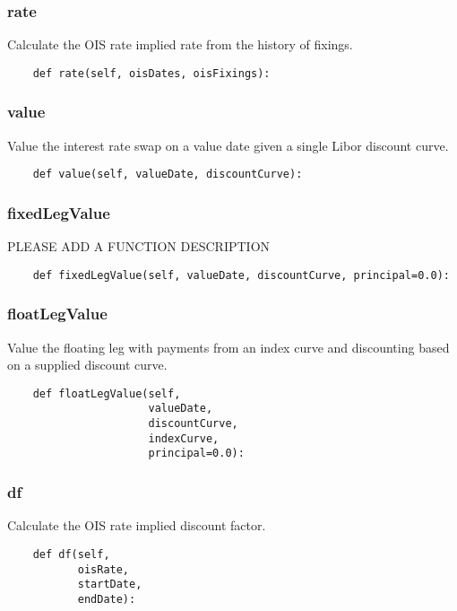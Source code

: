 \documentclass[twoside,11pt]{book}
\begin{document}
\subsubsection*{{\bf rate}}
Calculate the OIS rate implied rate from the history of fixings.  

\begin{lstlisting}
    def rate(self, oisDates, oisFixings):
\end{lstlisting}

\subsubsection*{{\bf value}}
Value the interest rate swap on a value date given a single Libor discount curve.  

\begin{lstlisting}
    def value(self, valueDate, discountCurve):
\end{lstlisting}

\subsubsection*{{\bf fixedLegValue}}
PLEASE ADD A FUNCTION DESCRIPTION

\begin{lstlisting}
    def fixedLegValue(self, valueDate, discountCurve, principal=0.0):
\end{lstlisting}

\subsubsection*{{\bf floatLegValue}}
Value the floating leg with payments from an index curve and discounting based on a supplied discount curve.  

\begin{lstlisting}
    def floatLegValue(self,
                      valueDate,
                      discountCurve,
                      indexCurve,
                      principal=0.0):
\end{lstlisting}

\subsubsection*{{\bf df}}
Calculate the OIS rate implied discount factor.  

\begin{lstlisting}
    def df(self,
           oisRate,
           startDate,
           endDate):
\end{lstlisting}
\end{document}
